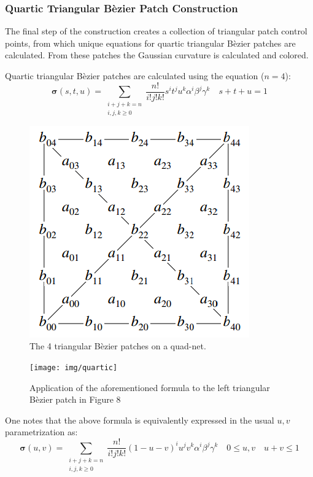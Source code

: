 \documentclass[11pt]{article}
\begin{document}
	\subsubsection*{Quartic Triangular B\`ezier Patch Construction}
	The final step of the construction creates a collection of triangular patch control points, from which unique equations for quartic triangular B\`ezier patches are calculated. From these patches the Gaussian curvature is calculated and colored.   
	
	Quartic triangular B\`ezier patches are calculated using the equation ($n=4$): 
	$$\bm{\sigma}(s,t,u) = \displaystyle \sum_{\begin{smallmatrix} i+j+k=n \\ i,j,k \ge 0\end{smallmatrix}} \frac{n!}{i!j!k!} s^i t^j u^k \alpha^i \beta^j \gamma^k \quad s + t + u = 1$$ 
	
	\begin{figure}[h]
		\centering
		\captionsetup{justification=centering}
		\includegraphics[width=.5\linewidth]{img/bezier_loop}
		\caption{The 4 triangular B\`ezier patches on a quad-net. \cite{loop1994smooth}}	
	\end{figure}
	
	\pagebreak
	
	\begin{figure}[h]
		\centering
		\captionsetup{justification=centering}
		\texttt{[image: img/quartic]}
		\caption{Application of the aforementioned formula to the left triangular B\`ezier patch in Figure 8}
	\end{figure}
	\vspace{0.45in}
	
	\quad\quad  One notes that the above formula is equivalently expressed in the usual $u,v$ parametrization as: 
	 $$\displaystyle \bm{\sigma}(u,v) = \sum_{\begin{smallmatrix} i+j+k=n \\ i,j,k \ge 0\end{smallmatrix}} \frac{n!}{i!j!k!} (1-u-v)^i u^j v^k \alpha^i \beta^j \gamma^k \quad0 \le u,v \quad u + v \le 1$$
	
\end{document}
